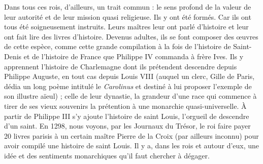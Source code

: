 \documentclass[french,twoside]{book} %
\begin{document}
Dans tous ces rois, d’ailleurs, un trait commun : le sens profond de la valeur de leur autorité et de leur mission quasi religieuse. Ils y ont été formés. Car ils ont tous été soigneusement instruits. Leurs maîtres leur ont parlé d’histoire et leur ont fait lire des livres d’histoire. Devenus adultes, ils se font composer des œuvres de cette espèce, comme cette grande compilation à la fois de l’histoire de Saint-Denis et de l’histoire de France que Philippe IV commanda à frère Ives. Ils y apprennent l’histoire de Charlemagne dont ils prétendent descendre depuis Philippe Auguste, en tout cas depuis Louis VIII (auquel un clerc, Gille de Paris, dédia un long poème intitulé le {\itshape Carolinus} et destiné à lui proposer l’exemple de son illustre aïeul) ; celle de leur dynastie, la grandeur d’une race qui commence à tirer de ses vieux souvenirs la prétention à une monarchie quasi-universelle. À partir de Philippe III s’y ajoute l’histoire de saint Louis, l’orgueil de descendre d’un saint. En 1298, nous voyons, par les Journaux du Trésor, le roi faire payer 20 livres parisis à un certain maître Pierre de la Croix (par ailleurs inconnu) pour avoir compilé une histoire de saint Louis. Il y a, dans les rois et autour d’eux, une idée et des sentiments monarchiques qu’il faut chercher à dégager.
\end{document}

